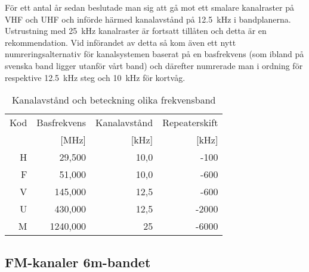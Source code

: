 För ett antal år sedan beslutade man sig att gå mot ett smalare
kanalraster på VHF och UHF och införde härmed kanalavstånd på 12.5~kHz
i bandplanerna. Ustrustning med 25~kHz kanalraster är fortsatt
tillåten och detta är en rekommendation. Vid införandet av detta så
kom även ett nytt numreringsalternativ för kanalsystemen baserat på en
basfrekvens (som ibland på svenska band ligger utanför vårt band) och
därefter numrerade man i ordning för respektive 12.5~kHz steg och
10~kHz för kortvåg.

\begin{table}[h]
\centering
\begin{tabular}{rrrr}
Kod & Basfrekvens & Kanalavstånd & Repeaterskift \\
    & [MHz]       & [kHz]        & [kHz] \\ \hline
H & 29,500 & 10,0 & -100 \\
F & 51,000 & 10,0 & -600 \\
V & 145,000& 12,5 & -600 \\
U & 430,000& 12,5 & -2000 \\
M & 1240,000 & 25 & -6000 \\
\end{tabular}
\label{tab:kanalavstand}
\caption{Kanalavstånd och beteckning olika frekvensband}
\end{table}

\subsection{FM-kanaler 6m-bandet}

